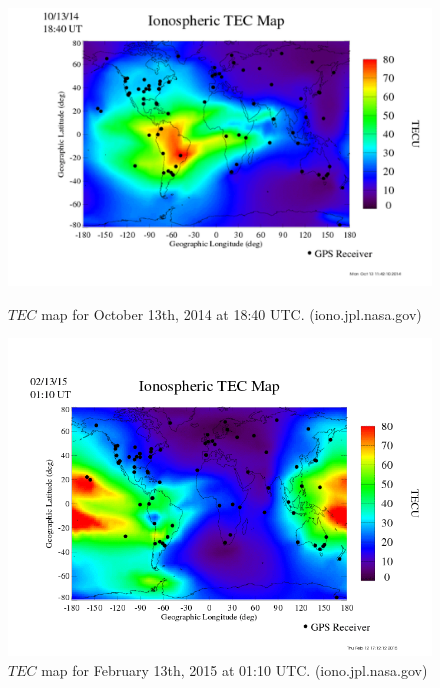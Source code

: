 \begin{figure}[htb]
\centering
\begin{minipage}[b]{0.48\textwidth}
\centering
\includegraphics[width=0.95\linewidth]{Ionosphere/figures/TEC_map_20141013_18-40UT.png}
\caption{$TEC$ map for October 13th, 2014 at 18:40 UTC. (iono.jpl.nasa.gov)  }
\label{Fig:fall_tec_global}
\end{minipage}%
\begin{minipage}[b]{0.02\textwidth}
\hspace{1cm}
\end{minipage}%
\begin{minipage}[b]{0.48\textwidth}
\centering
\includegraphics[width=0.95\linewidth]{Ionosphere/figures/TEC_map_20150213_01-10UT.png}
\caption{$TEC$ map for February 13th, 2015 at 01:10 UTC. (iono.jpl.nasa.gov)  }
\label{Fig:winter_tec_global}
\end{minipage}
\end{figure}



